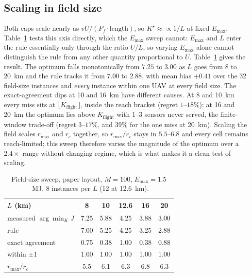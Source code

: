 \documentclass[journal,outdir=./]{IEEEtran}
\newcommand{\rmax}{r_{\max}}
\newcommand{\rc}{r_{c}}
\newcommand{\Pf}{P_{f}}
\newcommand{\Emax}{E_{\max}}
\begin{document}
\subsection{Scaling in field size}\label{sec:eval:L}
Both caps scale nearly as $vU/(\Pf\cdot\text{length})$, so $K^{\star}\approx\propto1/L$ at fixed $\Emax$. Table~\ref{tab:L} tests this axis directly, which the $\Emax$ sweep cannot: $\Emax$ and $L$ enter the rule essentially only through the ratio $U/L$, so varying $\Emax$ alone cannot distinguish the rule from any other quantity proportional to $U$. Table~\ref{tab:L} gives the result. The optimum falls monotonically from $7.25$ to $3.00$ as $L$ goes from 8 to 20~km and the rule tracks it from $7.00$ to $2.88$, with mean bias $+0.41$ over the 32 field-size instances and \emph{every} instance within one UAV at every field size. The exact-agreement dips at 10 and 16~km have different causes. At 8 and 10~km every miss sits at $\lfloor K_{\mathrm{flight}}\rfloor$, inside the reach bracket (regret $1$--$18\%$); at 16 and 20~km the optimum lies above $K_{\mathrm{flight}}$ with 1--3 sensors never served, the finite-window trade-off (regret $3$--$17\%$, and $39\%$ for the one miss at 20~km). Scaling the field scales $\rmax$ and $\rc$ together, so $\rmax/\rc$ stays in $5.5$--$6.8$ and every cell remains reach-limited; this sweep therefore varies the magnitude of the optimum over a $2.4\times$ range without changing regime, which is what makes it a clean test of scaling.

\begin{table}[t]\centering
\caption{Field-size sweep, paper layout, $M=100$, $\Emax=1.5$~MJ, 8 instances per $L$ (12 at 12.6~km).}
\label{tab:L}
\small
\begin{tabular}{lccccc}
\toprule
$L$ (km) & 8 & 10 & 12.6 & 16 & 20\\
\midrule
measured $\arg\min_K J$ & 7.25 & 5.88 & 4.25 & 3.88 & 3.00\\
rule & 7.00 & 5.25 & 4.25 & 3.25 & 2.88\\
exact agreement & 0.75 & 0.38 & 1.00 & 0.38 & 0.88\\
within $\pm1$ & 1.00 & 1.00 & 1.00 & 1.00 & 1.00\\
$\rmax/\rc$ & 5.5 & 6.1 & 6.3 & 6.8 & 6.3\\
\bottomrule
\end{tabular}
\end{table}
\end{document}
